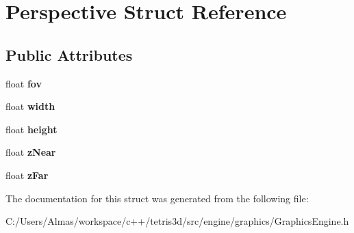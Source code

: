 \hypertarget{struct_perspective}{\section{Perspective Struct Reference}
\label{struct_perspective}
}
\subsection*{Public Attributes}
\begin{DoxyCompactItemize}
\item 
\hypertarget{struct_perspective_ac1a45814762339c6fe4983d10a9c1a6c}{float {\bfseries fov}}\label{struct_perspective_ac1a45814762339c6fe4983d10a9c1a6c}

\item 
\hypertarget{struct_perspective_ab3b6805780d4efab8a1b1fd349739101}{float {\bfseries width}}\label{struct_perspective_ab3b6805780d4efab8a1b1fd349739101}

\item 
\hypertarget{struct_perspective_a621bb3e887419b316bfc19465dd9afe5}{float {\bfseries height}}\label{struct_perspective_a621bb3e887419b316bfc19465dd9afe5}

\item 
\hypertarget{struct_perspective_aaea4ec3f3a0e6fd17d190b5c3167b014}{float {\bfseries z\-Near}}\label{struct_perspective_aaea4ec3f3a0e6fd17d190b5c3167b014}

\item 
\hypertarget{struct_perspective_a6c05b85ad9c215250585a94f6f7af7f2}{float {\bfseries z\-Far}}\label{struct_perspective_a6c05b85ad9c215250585a94f6f7af7f2}

\end{DoxyCompactItemize}


The documentation for this struct was generated from the following file\-:\begin{DoxyCompactItemize}
\item 
C\-:/\-Users/\-Almas/workspace/c++/tetris3d/src/engine/graphics/Graphics\-Engine.\-h\end{DoxyCompactItemize}
